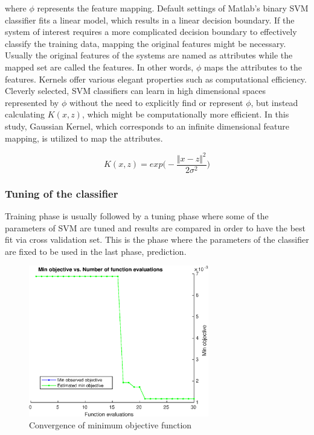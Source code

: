 where $\phi$ represents the feature mapping. 
Default settings of Matlab's binary SVM classifier fits a linear model, which results in a linear decision boundary. 
If the system of interest requires a more complicated decision boundary to effectively classify the training data, mapping the original features might be necessary. 
Usually the original features of the systems are named as attributes while the mapped set are called the features. 
In other words, $\phi$ maps the attributes to the features. Kernels offer various elegant properties such as computational efficiency. 
Cleverly selected, SVM classifiers can learn in high dimensional spaces represented by $\phi$ without the need to explicitly find or represent $\phi$, but instead calculating $K(x,z)$, which might be computationally more efficient. 
In this study, Gaussian Kernel, which corresponds to an infinite dimensional feature mapping, is utilized to map the attributes.

\begin{equation}
K (x,z) = exp \bigg(-\frac{\Vert x - z \Vert ^ 2}{2 \sigma^2} \bigg)
\end{equation}

\subsubsection{Tuning of the classifier}

Training phase is usually followed by a tuning phase where some of the parameters of SVM are tuned and results are compared in order to have the best fit via cross validation set. This is the phase where the parameters of the classifier are fixed to be used in the last phase, prediction.

\begin{figure}
\begin{center}
\includegraphics[width=0.7\textwidth]{figures/objectiveFuncEval}    %
\caption{Convergence of minimum objective function} 
\label{fig:objectiveFuncEval}
\end{center}
\end{figure}

